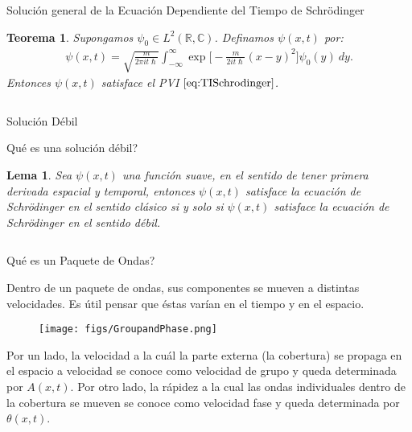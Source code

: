 \documentclass[aspectratio=1610]{beamer}
\newcommand*{\field}[1]{\mathbb{#1}}
\newtheorem*{teo}{Teorema}
\newtheorem*{lem}{Lema}
\begin{document}
\begin{frame}{Solución general de la Ecuación Dependiente del Tiempo de Schrödinger}
   
\begin{teo}
    Supongamos $\psi_{0} \in L^2(\field{R},\field{C})$. Definamos $\psi(x,t)$ por:
    \begin{align*}
        \psi(x,t) = \sqrt{\frac{m}{2\pi it\hslash}}\int_{-\infty}^{\infty}\exp\bigg[-\frac{m}{2it\hslash}(x-y)^2\bigg]\psi_{0}(y) \: dy.
    \end{align*}
    Entonces $\psi(x,t)$ satisface el PVI $\eqref{eq:TISchrodinger}$.
    \label{teo:Rev4}
\end{teo}
    
\begin{columns}
\column{37em}
\end{columns}
\end{frame}

\begin{frame}{Solución Débil}
   
Qué es una solución débil?   
   
\begin{lem}
    Sea $\psi(x,t)$ una función suave, en el sentido de tener primera derivada espacial y temporal, entonces $\psi(x,t)$ satisface la ecuación de Schrödinger en el sentido clásico si y solo si $\psi(x,t)$ satisface la ecuación de Schrödinger en el sentido débil.
\end{lem}
    
\begin{columns}
\column{37em}
\end{columns}
\end{frame}


\begin{frame}{Qué es un Paquete de Ondas?}
   
Dentro de un paquete de ondas, sus componentes se mueven a distintas velocidades. Es útil pensar que éstas varían en el tiempo y en el espacio.  
\begin{figure}[h]
    \centering
    \texttt{[image: figs/GroupandPhase.png]}
\end{figure}
Por un lado, la velocidad a la cuál la parte externa (la cobertura) se propaga en el espacio a velocidad se conoce como velocidad de grupo y queda determinada por $A(x,t)$. Por otro lado, la rápidez a la cual las ondas individuales dentro de la cobertura se mueven se conoce como velocidad fase y queda determinada por $\theta(x,t)$. 
    
\begin{columns}
\column{37em}
\end{columns}
\end{frame}
\end{document}
